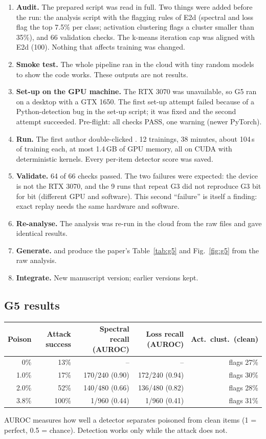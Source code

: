\begin{enumerate}
\item \textbf{Audit.} The prepared script was read in full. Two things were added before the
  run: the analysis script with the flagging rules of E2d (spectral and loss flag the top
  7.5\% per class; activation clustering flags a cluster smaller than 35\%), and 66 validation
  checks. The k-means iteration cap was aligned with E2d (100). Nothing that affects training
  was changed.
\item \textbf{Smoke test.} The whole pipeline ran in the cloud with tiny random models to show
  the code works. These outputs are not results.
\item \textbf{Set-up on the GPU machine.} The RTX 3070 was unavailable, so G5 ran on a desktop
  with a GTX 1650. The first set-up attempt failed because of a Python-detection bug in the
  set-up script; it was fixed and the second attempt succeeded. Pre-flight: all checks PASS,
  one warning (newer PyTorch).
\item \textbf{Run.} The first author double-clicked . 12 trainings,
  38 minutes, about 104\,s of training each, at most 1.4\,GB of GPU memory, all on CUDA with
  deterministic kernels. Every per-item detector score was saved.
\item \textbf{Validate.} 64 of 66 checks passed. The two failures were expected: the device is
  not the RTX 3070, and the 9 runs that repeat G3 did not reproduce G3 bit for bit (different
  GPU and software). This second ``failure'' is itself a finding: exact replay needs the same
  hardware and software.
\item \textbf{Re-analyse.} The analysis was re-run in the cloud from the raw files and gave
  identical results.
\item \textbf{Generate.}  and  produce the paper's Table~\ref{tab:g5} and Fig.~\ref{fig:g5} from the raw analysis.
\item \textbf{Integrate.} New manuscript version; earlier versions kept.
\end{enumerate}

\subsection*{G5 results}
\begin{center}\small
\begin{tabular}{@{}rrrrr@{}}
\toprule
Poison & Attack success & Spectral recall (AUROC) & Loss recall (AUROC) & Act.\ clust.\ (clean)\\
\midrule
0\% & 13\% & -- & -- & flags 27\%\\
1.0\% & 17\% & 170/240 (0.90) & 172/240 (0.94) & flags 30\%\\
2.0\% & 52\% & 140/480 (0.66) & 136/480 (0.82) & flags 28\%\\
3.8\% & 100\% & 1/960 (0.44) & 1/960 (0.41) & flags 31\%\\
\bottomrule
\end{tabular}
\end{center}
AUROC measures how well a detector separates poisoned from clean items (1 = perfect,
0.5 = chance). Detection works only while the attack does not.

